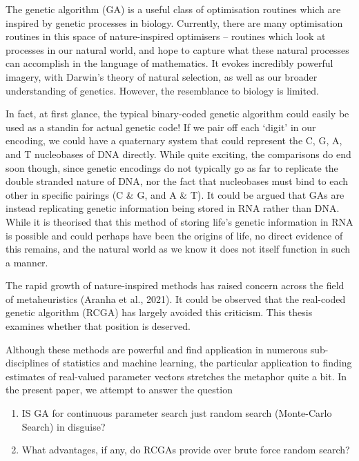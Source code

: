\documentclass[
  a4paper,
  DIV=11,
  numbers=noendperiod]{scrartcl}
\providecommand{\tightlist}{%
  \setlength{\itemsep}{0pt}\setlength{\parskip}{0pt}}
\newcommand{\+}{\phantom{-}}
\begin{document}
The genetic algorithm (GA) is a useful class of optimisation routines
which are inspired by genetic processes in biology. Currently, there are
many optimisation routines in this space of nature-inspired optimisers
-- routines which look at processes in our natural world, and hope to
capture what these natural processes can accomplish in the language of
mathematics. It evokes incredibly powerful imagery, with Darwin's theory
of natural selection, as well as our broader understanding of genetics.
However, the resemblance to biology is limited.

In fact, at first glance, the typical binary-coded genetic algorithm
could easily be used as a standin for actual genetic code! If we pair
off each `digit' in our encoding, we could have a quaternary system that
could represent the C, G, A, and T nucleobases of DNA directly. While
quite exciting, the comparisons do end soon though, since genetic
encodings do not typically go as far to replicate the double stranded
nature of DNA, nor the fact that nucleobases must bind to each other in
specific pairings (C \& G, and A \& T). It could be argued that GAs are
instead replicating genetic information being stored in RNA rather than
DNA. While it is theorised that this method of storing life's genetic
information in RNA is possible and could perhaps have been the origins
of life, no direct evidence of this remains, and the natural world as we
know it does not itself function in such a manner.

The rapid growth of nature-inspired methods has raised concern across
the field of metaheuristics (Aranha et al., 2021). It could be observed
that the real-coded genetic algorithm (RCGA) has largely avoided this
criticism. This thesis examines whether that position is deserved.

Although these methods are powerful and find application in numerous
sub-disciplines of statistics and machine learning, the particular
application to finding estimates of real-valued parameter vectors
stretches the metaphor quite a bit. In the present paper, we attempt to
answer the question

\begin{enumerate}
\def\labelenumi{\arabic{enumi})}
\tightlist
\item
  IS GA for continuous parameter search just random search (Monte-Carlo
  Search) in disguise?
\item
  What advantages, if any, do RCGAs provide over brute force random
  search?
\end{enumerate}
\end{document}

